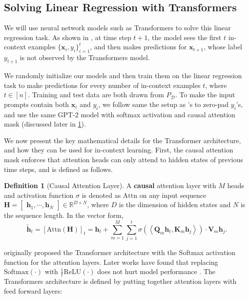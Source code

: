 \documentclass[11pt]{article}
\theoremstyle{plain}
\theoremstyle{definition}
\newtheorem{definition}[theorem]{Definition}
\theoremstyle{remark}
\renewcommand{\^}[1]{^{(#1)}}
\newcommand{\bx}{\boldsymbol{x}}
\newcommand{\bh}{\boldsymbol{h}}
\newcommand{\bK}{\boldsymbol{K}}
\newcommand{\bH}{\boldsymbol{H}}
\newcommand{\bQ}{\boldsymbol{Q}}
\newcommand{\bV}{\boldsymbol{V}}
\newcommand{\inner}[1]{ \left\langle {#1} \right\rangle }
\begin{document}
\vspace{-1mm}
\subsection{Solving Linear Regression with Transformers}
\vspace{-1mm}

We will use neural network models such as Transformers to solve this linear regression task. As shown in , at time step $t+1$, the model sees the first $t$ in-context examples $\{\bx_i,y_i\}_{i=1}^t$, and then makes predictions for $\bx_{t+1}$, whose label $y_{t+1}$ is not observed by the Transformers model.

We randomly initialize our models and then train them on the linear regression task to make predictions for every number of in-context examples $t$, where $t\in [n]$. Training and test data are both drawn from $P_{\mathcal{D}}$. To make the input prompts contain both $\bx_i$ and $y_i$,  we follow same the setup as \citet{Garg2022WhatCT}'s to zero-pad $y_i$'s, and use the same GPT-2 model \citep{radford2019language} with softmax activation and causal attention mask  (discussed later in \cref{def:attn}). 

We now present the key mathematical details for the Transformer architecture, and how  they can be used for in-context learning.
First, the causal attention mask enforces that attention heads can only attend to hidden states of previous time steps, and is defined as follows.

\begin{definition}[Causal Attention Layer]\label{def:attn}
    A \textbf{causal} attention layer with $M$ heads and activation function $\sigma$  is denoted as $\mathrm{Attn}$ on any input sequence $\bH = \begin{bmatrix}
        \bh_1, \cdots, \bh_N
    \end{bmatrix} \in \mathbb R^{D \times N}$, where $D$ is the dimension of hidden states and $N$ is the sequence length. In the vector form,
    \begin{equation}
        \tilde{\bh}_t = [\mathrm{Attn}(\bH)]_t = \bh_t +  \sum_{m=1}^M \sum_{j=1}^t \sigma \left(\inner{\bQ_m \bh_t, \bK_m \bh_j}\right) \cdot \bV_m \bh_j.
    \end{equation}
\end{definition}
\citet{Vaswani2017AttentionIA} originally proposed the Transformer architecture with the Softmax activation function for the attention layers. Later works have found that replacing $\mathrm{Softmax}(\cdot)$ with $\frac{1}{t} \mathrm{ReLU}(\cdot)$ does not hurt model performance \citep{Cai2022EfficientViTEL,shen2023study,wortsman2023replacing}. The Transformers architecture is defined by putting together attention layers with feed forward layers: 
\end{document}
